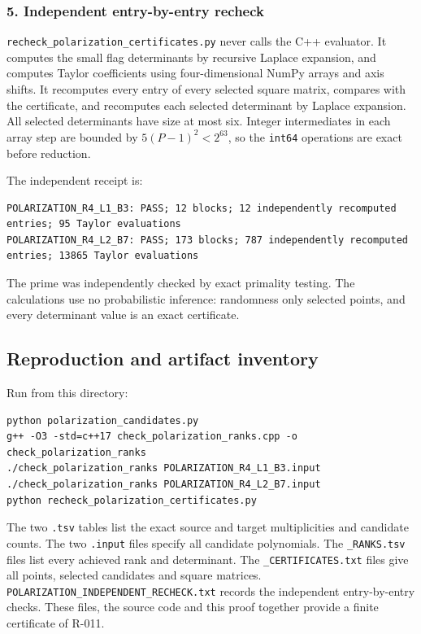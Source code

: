 \documentclass[
  10pt,
]{article}
\begin{document}
\subsubsection{5. Independent entry-by-entry
recheck}\label{independent-entry-by-entry-recheck}

\texttt{\small recheck\_\allowbreak{}polarization\_\allowbreak{}certificates.py}
never calls the C++ evaluator. It computes the small flag determinants
by recursive Laplace expansion, and computes Taylor coefficients using
four-dimensional NumPy arrays and axis shifts. It recomputes every entry
of every selected square matrix, compares with the certificate, and
recomputes each selected determinant by Laplace expansion. All selected
determinants have size at most six. Integer intermediates in each array
step are bounded by \(5(P-1)^2<2^{63}\), so the \texttt{\small int64}
operations are exact before reduction.

The independent receipt is:

\begin{verbatim}
POLARIZATION_R4_L1_B3: PASS; 12 blocks; 12 independently recomputed entries; 95 Taylor evaluations
POLARIZATION_R4_L2_B7: PASS; 173 blocks; 787 independently recomputed entries; 13865 Taylor evaluations
\end{verbatim}

The prime was independently checked by exact primality testing. The
calculations use no probabilistic inference: randomness only selected
points, and every determinant value is an exact certificate.

\subsection{Reproduction and artifact
inventory}\label{reproduction-and-artifact-inventory}

Run from this directory:

\begin{verbatim}
python polarization_candidates.py
g++ -O3 -std=c++17 check_polarization_ranks.cpp -o check_polarization_ranks
./check_polarization_ranks POLARIZATION_R4_L1_B3.input
./check_polarization_ranks POLARIZATION_R4_L2_B7.input
python recheck_polarization_certificates.py
\end{verbatim}

The two \texttt{\small .tsv} tables list the exact source and target
multiplicities and candidate counts. The two \texttt{\small .input}
files specify all candidate polynomials. The
\texttt{\small \_\allowbreak{}RANKS.tsv} files list every achieved rank
and determinant. The \texttt{\small \_\allowbreak{}CERTIFICATES.txt}
files give all points, selected candidates and square matrices.
\texttt{\small POLARIZATION\_\allowbreak{}INDEPENDENT\_\allowbreak{}RECHECK.txt}
records the independent entry-by-entry checks. These files, the source
code and this proof together provide a finite certificate of R-011.
\end{document}
